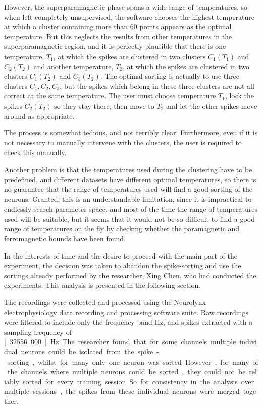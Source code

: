 However, the superparamagnetic phase spans a wide range of temperatures, so when left completely unsupervised, the software chooses the highest temperature at which a cluster containing more than 60 points appears as the optimal temperature. But this neglects the results from other temperatures in the superparamagnetic region, and it is perfectly plausible that there is one temperature, $T_1$, at which the spikes are clustered in two clusters $C_{1}(T_1)$ and $C_{2}(T_2)$
and another temperature, $T_2$, at which the spikes are clustered in two clusters $C_{1}(T_2)$ and $C_{3}(T_2)$.
The optimal sorting is actually to use three clusters $C_1, C_2, C_3$, but the spikes which belong in these three clusters are not all correct at the same temperature. The user must choose temperature $T_1$, lock the spikes $C_{2}(T_2)$ so they stay there, then move to $T_2$ and let the other spikes move around as appropriate.

The process is somewhat tedious, and not terribly clear.
Furthermore, even if it is not necessary to manually intervene with the clusters, the user is required to check this manually.

Another problem is that the temperatures used during the clustering have to be predefined, and different datasets have different optimal temperatures, so there is no guarantee that the range of temperatures used will find a good sorting of the neurons. Granted, this is an understandable limitation, since it is impractical to endlessly search parameter space, and most of the time the range of temperatures used will be suitable, but it seems that it would not be so difficult to find a good range of temperatures on the fly by checking whether the paramagnetic and ferromagnetic bounds have been found.

In the interests of time and the desire to proceed with the main part of the experiment, the decision was taken to abandon the spike-sorting and use the sortings already performed by the researcher, Xing Chen, who had conducted the experiments. This analysis is presented in the following section.

The recordings were collected and processed using the Neurolynx electrophysiology data recording and processing software suite.
Raw recordings were filtered to include only the frequency band \unit[600--4000]{Hz}, and spikes extracted with a sampling frequency of \unit[32556.000]{Hz}.

The researcher found that for some channels multiple individual neurons could be isolated from the spike-sorting, whilst for many only one neuron was sorted. However, for many of the channels where multiple neurons could be sorted, they could not be reliably sorted for every training session. So for consistency in the analysis over multiple sessions, the spikes from these individual neurons were merged together.

